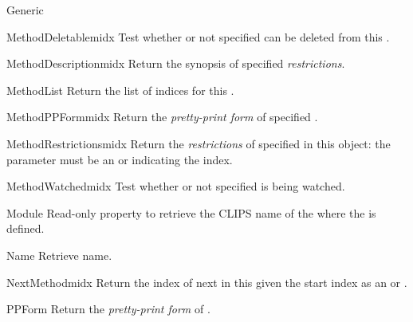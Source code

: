 \begin{classdesc*}{Generic}
\begin{methoddesc}{MethodDeletable}{midx}
Test whether or not specified  can be deleted from this
.
\end{methoddesc}

\begin{methoddesc}{MethodDescription}{midx}
Return the synopsis of specified  \emph{restrictions}.
\end{methoddesc}

\begin{methoddesc}{MethodList}{}
Return the list of  indices for this .
\end{methoddesc}

\begin{methoddesc}{MethodPPForm}{midx}
Return the \emph{pretty-print form} of specified .
\end{methoddesc}

\begin{methoddesc}{MethodRestrictions}{midx}
Return the \emph{restrictions} of specified  in this
 object: the  parameter must be an
 or  indicating the  index.
\end{methoddesc}

\begin{methoddesc}{MethodWatched}{midx}
Test whether or not specified  is being watched.
\end{methoddesc}

\begin{memberdesc}[property]{Module}
Read-only property to retrieve the CLIPS name of the 
where the  is defined.
\end{memberdesc}

\begin{memberdesc}[property]{Name}
Retrieve  name.
\end{memberdesc}

\begin{methoddesc}{NextMethod}{midx}
Return the index of next  in this  given
the start index as an  or .
\end{methoddesc}

\begin{methoddesc}{PPForm}{}
Return the \emph{pretty-print form} of .
\end{methoddesc}


\end{classdesc*}
